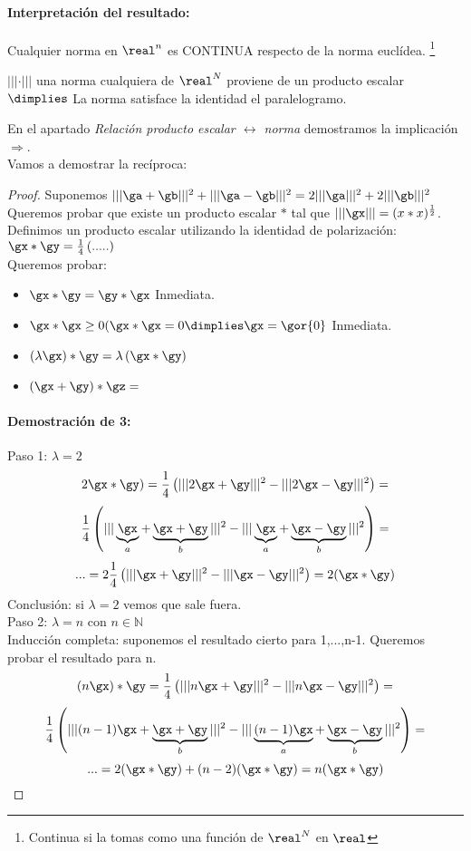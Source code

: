 \documentclass[a4paper,10pt]{apuntes}
\begin{document}
\paragraph{Interpretación del resultado:}
Cualquier norma en $\real^n$ es CONTINUA respecto de la norma euclídea. \footnote{Continua si la tomas como una función de $\real^N$ en $\real$}
\begin{theorem}
$|||\cdot|||$ una norma cualquiera de $\real^N$ proviene de un producto escalar $\dimplies$ La norma satisface la identidad el paralelogramo. 
\end{theorem}
En el apartado \emph{Relación producto escalar $\leftrightarrow$ norma} demostramos la implicación $\Rightarrow$.\\
Vamos a demostrar la recíproca:
\begin{proof}
Suponemos $|||\ga+\gb|||^2 + ||| \ga-\gb|||^2 = 2 |||\ga|||^2 + 2|||\gb|||^2$\\
Queremos probar que existe un producto escalar $\ast$ tal que $|||\gx||| = (x*x)^\frac{1}{2}$.\\
Definimos un producto escalar utilizando la identidad de polarización: $\gx*\gy = \frac{1}{4} \left( .....\right)$\\
Queremos probar:
\begin{itemize}
 \item $\gx*\gy = \gy*\gx$ Inmediata.
 \item $\gx*\gx \ge 0 (\gx*\gx = 0 \dimplies \gx=\gor{0}$ Inmediata.
 \item $(\lambda \gx) \ast \gy = \lambda\left(\gx\ast\gy\right)$
 \item $(\gx+\gy)*\gz = $
\end{itemize}

\paragraph{Demostración de 3:}

Paso 1: $\lambda = 2$
$$2\gx*\gy) = \frac{1}{4} \left(|||2\gx+\gy|||^2 - |||2\gx-\gy|||^2\right) = $$
$$\frac{1}{4} \left(|||\underbrace{\gx}_a + \underbrace{\gx+\gy}_b|||^2 - |||\underbrace{\gx}_a+\underbrace{\gx-\gy}_b|||^2\right) = $$
$$ ... = 2 \frac{1}{4} \left(|||\gx+\gy|||^2 - |||\gx-\gy|||^2\right) = 2 (\gx*\gy) $$
Conclusión: si $\lambda = 2$ vemos que sale fuera.\\
Paso 2: $\lambda = n$ con $n \in \mathbb{N}$\\
Inducción completa: suponemos el resultado cierto para 1,...,n-1. Queremos probar el resultado para n.
$$(n\gx)*\gy = \frac{1}{4} \left(|||n\gx+\gy|||^2 - |||n\gx-\gy|||^2\right) =$$
$$ \frac{1}{4} \left(|||(n-1)\gx+\underbrace{\gx+\gy}_b|||^2 - |||\underbrace{(n-1)\gx}_a+ \underbrace{\gx-\gy}_b|||^2\right)=$$
$$...=2(\gx*\gy) + (n-2)(\gx*\gy) = n (\gx*\gy)$$


\end{proof}
\end{document}
